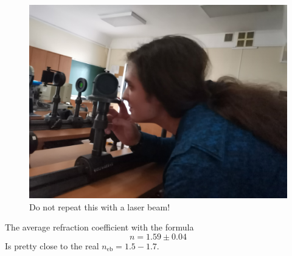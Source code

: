 \begin{minipage}{0.45\textwidth}
    \begin{figure}[h]
    \centering
    \includegraphics[width=1\textwidth]{images/brew_exp.jpg}
    \caption{Do not repeat this with a laser beam!}
\end{figure}
\end{minipage}
\hfill
\begin{minipage}{0.45\textwidth}
	The average refraction coefficient with the formula
	\begin{equation*}
	\boxed{
		n = 1.59 \pm  0.04
	}
	\end{equation*}
	Is pretty close to the real $n_{\text{eb}} = 1.5-1.7$.
\end{minipage}


